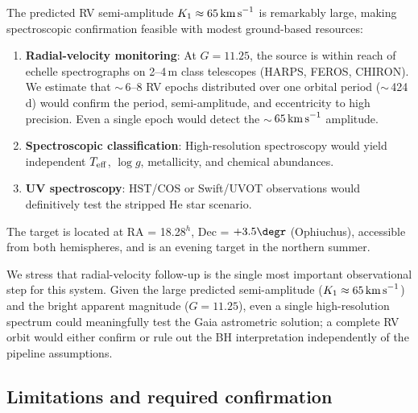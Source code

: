 \documentclass[usenatbib,fleqn]{mnras}
\newcommand{\kms}{{\rm km\,s}^{-1}}
\begin{document}
The predicted RV semi-amplitude $K_1 \approx 65\,\kms$ is
remarkably large, making spectroscopic confirmation feasible
with modest ground-based resources:
\begin{enumerate}
\item \textbf{Radial-velocity monitoring}: At $G = 11.25$, the
  source is within reach of echelle spectrographs on 2--4\,m class
  telescopes (HARPS, FEROS, CHIRON).  We estimate that
  $\sim$\,6--8 RV epochs distributed over one orbital period
  ($\sim$\,424\,d) would confirm the period, semi-amplitude, and
  eccentricity to high precision.  Even a single epoch would
  detect the $\sim$\,$65\,\kms$ amplitude.
\item \textbf{Spectroscopic classification}: High-resolution
  spectroscopy would yield independent $T_{\rm eff}$, $\log g$,
  metallicity, and chemical abundances.
\item \textbf{UV spectroscopy}: HST/COS or Swift/UVOT observations
  would definitively test the stripped He star scenario.
\end{enumerate}

The target is located at RA = 18.28$^h$, Dec = $+3.5\degr$
(Ophiuchus), accessible from both hemispheres, and is an evening
target in the northern summer.

We stress that radial-velocity follow-up is the single most
important observational step for this system.  Given the large
predicted semi-amplitude ($K_1 \approx 65\,\kms$) and the
bright apparent magnitude ($G = 11.25$), even a single high-resolution
spectrum could meaningfully test the Gaia astrometric solution;
a complete RV orbit would either confirm or rule out the BH
interpretation independently of the pipeline assumptions.

\subsection{Limitations and required confirmation}
\end{document}
